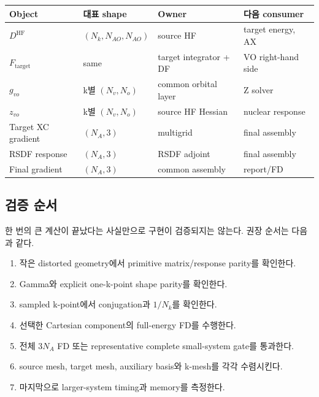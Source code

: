 \begin{center}
\begin{longtable}{>{\raggedright\arraybackslash}p{}
                  >{\raggedright\arraybackslash}p{}
                  >{\raggedright\arraybackslash}p{}
                  >{\raggedright\arraybackslash}p{}}
\toprule
Object & 대표 shape & Owner & 다음 consumer \\
\midrule
$D^{\mathrm{HF}}$ & $(N_k,N_{AO},N_{AO})$ & source HF & target energy, AX \\
$F_{\mathrm{target}}$ & same & target integrator + DF & VO right-hand side \\
$g_{vo}$ & k별 $(N_v,N_o)$ & common orbital layer & Z solver \\
$z_{vo}$ & k별 $(N_v,N_o)$ & source HF Hessian & nuclear response \\
Target XC gradient & $(N_A,3)$ & multigrid & final assembly \\
RSDF response & $(N_A,3)$ & RSDF adjoint & final assembly \\
Final gradient & $(N_A,3)$ & common assembly & report/FD \\
\bottomrule
\end{longtable}
\end{center}

\subsection{검증 순서}

한 번의 큰 계산이 끝났다는 사실만으로 구현이 검증되지는 않는다. 권장 순서는 다음과
같다.
\begin{enumerate}
  \item 작은 distorted geometry에서 primitive matrix/response parity를 확인한다.
  \item Gamma와 explicit one-k-point shape parity를 확인한다.
  \item sampled k-point에서 conjugation과 $1/N_k$를 확인한다.
  \item 선택한 Cartesian component의 full-energy FD를 수행한다.
  \item 전체 $3N_A$ FD 또는 representative complete small-system gate를 통과한다.
  \item source mesh, target mesh, auxiliary basis와 k-mesh를 각각 수렴시킨다.
  \item 마지막으로 larger-system timing과 memory를 측정한다.
\end{enumerate}

